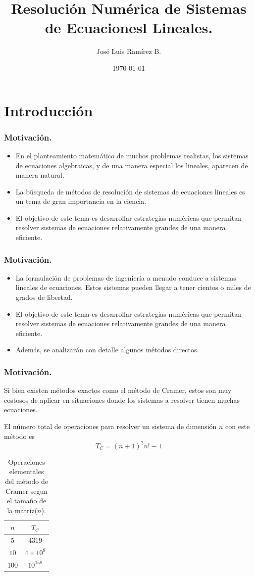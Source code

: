 \documentclass{beamer}
\title{Resoluci\'on Num\'erica de Sistemas de Ecuacionesl Lineales.}
\author{Jos\'e Luis Ram\'irez B.}
\date{\today}
\begin{document}
\frame{\titlepage}

\frame{\tableofcontents}

\section{Introducci\'on}
\begin{frame}[fragile]
  \frametitle{Motivaci\'on.} 
  \begin{itemize}
    \item En el planteamiento matem\'atico de muchos problemas realistas, los sistemas de ecuaciones algebraicas, y de una manera especial los lineales, aparecen de manera natural.
    \item<2-> La b\'usqueda de m\'etodos de resoluci\'on de sistemas de ecuaciones lineales es un tema de gran importancia en la ciencia.
    \item<3-> El objetivo de este tema es desarrollar estrategias num\'ericas que permitan resolver sistemas de ecuaciones relativamente grandes de una manera eficiente.
  \end{itemize}    
\end{frame}
\frame
{
  \frametitle{Motivaci\'on.} 
  \begin{itemize}
   \item<1->La formulaci\'on de problemas de ingenier\'ia a menudo conduce a sistemas lineales de ecuaciones. Estos sistemas pueden llegar a tener cientos o miles de grados de libertad. 
   \item<2-> El objetivo de este tema es desarrollar estrategias num\'ericas que permitan resolver sistemas de ecuaciones relativamente grandes de una manera eficiente. 
   \item<3-> Adem\'as, se analizar\'an con detalle algunos m\'etodos directos.
  \end{itemize}
}
\frame
{
   \frametitle{Motivaci\'on.}
   
Si bien existen m\'etodos exactos  como el m\'etodo de Cramer, estos son muy costosos de aplicar en situaciones donde los sistemas a resolver tienen muchas ecuaciones.

El n\'umero total de operaciones para resolver un sistema de dimensi\'on $n$ con este m\'etodo es
$$
T_C = (n+1)^{2}n!-1
$$

\begin{table}[!ht]
 \begin{tabular}{|c|c|}\hline
$n$ & $T_C$  \\\hline
$5$ & $4319$ \\\hline
$10$ & $4\times10^8$\\\hline
$100$ &  $10^{158}$\\\hline
 \end{tabular}
\caption{Operaciones elementales del m\'etodo de Cramer segun el tama\~no de la matriz($n$).}
\end{table}
}
\end{document}
